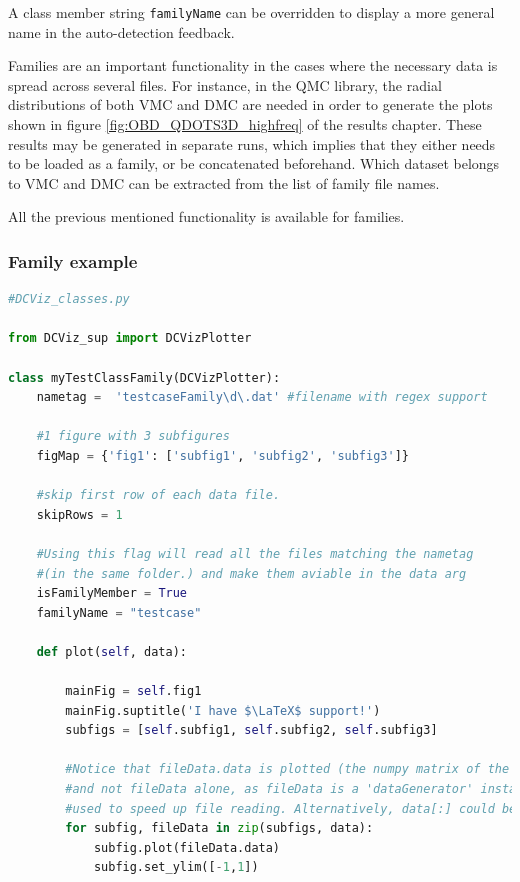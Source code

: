 A class member string \verb+familyName+ can be overridden to display a more general name in the auto-detection feedback. 

Families are an important functionality in the cases where the necessary data is spread across several files. For instance, in the QMC library, the radial distributions of both VMC and DMC are needed in order to generate the plots shown in figure \ref{fig:OBD_QDOTS3D_highfreq} of the results chapter. These results may be generated in separate runs, which implies that they either needs to be loaded as a family, or be concatenated beforehand. Which dataset belongs to VMC and DMC can be extracted from the list of family file names.

All the previous mentioned functionality is available for families.


\subsubsection{Family example}

\vspace{0.5cm}
\begin{lstlisting}[language=Python, otherkeywords={self}]
#DCViz_classes.py

from DCViz_sup import DCVizPlotter

class myTestClassFamily(DCVizPlotter):
    nametag =  'testcaseFamily\d\.dat' #filename with regex support
    
    #1 figure with 3 subfigures
    figMap = {'fig1': ['subfig1', 'subfig2', 'subfig3']}
    
    #skip first row of each data file.
    skipRows = 1    

    #Using this flag will read all the files matching the nametag
    #(in the same folder.) and make them aviable in the data arg    
    isFamilyMember = True
    familyName = "testcase"
    
    def plot(self, data):
        
        mainFig = self.fig1
        mainFig.suptitle('I have $\LaTeX$ support!')        
        subfigs = [self.subfig1, self.subfig2, self.subfig3]
    
        #Notice that fileData.data is plotted (the numpy matrix of the columns) 
        #and not fileData alone, as fileData is a 'dataGenerator' instance 
        #used to speed up file reading. Alternatively, data[:] could be sent
        for subfig, fileData in zip(subfigs, data):
            subfig.plot(fileData.data)
            subfig.set_ylim([-1,1])
\end{lstlisting}

